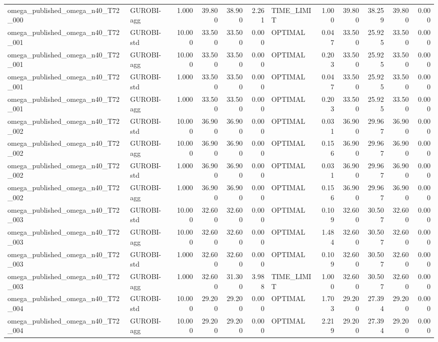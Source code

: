 \begin{table}[htbp]
\begin{tabular}{llrrrrlrrrrr}
omega\_published\_omega\_n40\_T72\_000 & GUROBI-agg & 1.000 & 39.800 & 38.900 & 2.261 & TIME\_LIMIT & 1.000 & 39.800 & 38.259 & 39.800 & 0.000 \\
omega\_published\_omega\_n40\_T72\_001 & GUROBI-std & 10.000 & 33.500 & 33.500 & 0.000 & OPTIMAL & 0.047 & 33.500 & 25.925 & 33.500 & 0.000 \\
omega\_published\_omega\_n40\_T72\_001 & GUROBI-agg & 10.000 & 33.500 & 33.500 & 0.000 & OPTIMAL & 0.203 & 33.500 & 25.925 & 33.500 & 0.000 \\
omega\_published\_omega\_n40\_T72\_001 & GUROBI-std & 1.000 & 33.500 & 33.500 & 0.000 & OPTIMAL & 0.047 & 33.500 & 25.925 & 33.500 & 0.000 \\
omega\_published\_omega\_n40\_T72\_001 & GUROBI-agg & 1.000 & 33.500 & 33.500 & 0.000 & OPTIMAL & 0.203 & 33.500 & 25.925 & 33.500 & 0.000 \\
omega\_published\_omega\_n40\_T72\_002 & GUROBI-std & 10.000 & 36.900 & 36.900 & 0.000 & OPTIMAL & 0.031 & 36.900 & 29.967 & 36.900 & 0.000 \\
omega\_published\_omega\_n40\_T72\_002 & GUROBI-agg & 10.000 & 36.900 & 36.900 & 0.000 & OPTIMAL & 0.156 & 36.900 & 29.967 & 36.900 & 0.000 \\
omega\_published\_omega\_n40\_T72\_002 & GUROBI-std & 1.000 & 36.900 & 36.900 & 0.000 & OPTIMAL & 0.031 & 36.900 & 29.967 & 36.900 & 0.000 \\
omega\_published\_omega\_n40\_T72\_002 & GUROBI-agg & 1.000 & 36.900 & 36.900 & 0.000 & OPTIMAL & 0.156 & 36.900 & 29.967 & 36.900 & 0.000 \\
omega\_published\_omega\_n40\_T72\_003 & GUROBI-std & 10.000 & 32.600 & 32.600 & 0.000 & OPTIMAL & 0.109 & 32.600 & 30.507 & 32.600 & 0.000 \\
omega\_published\_omega\_n40\_T72\_003 & GUROBI-agg & 10.000 & 32.600 & 32.600 & 0.000 & OPTIMAL & 1.484 & 32.600 & 30.507 & 32.600 & 0.000 \\
omega\_published\_omega\_n40\_T72\_003 & GUROBI-std & 1.000 & 32.600 & 32.600 & 0.000 & OPTIMAL & 0.109 & 32.600 & 30.507 & 32.600 & 0.000 \\
omega\_published\_omega\_n40\_T72\_003 & GUROBI-agg & 1.000 & 32.600 & 31.300 & 3.988 & TIME\_LIMIT & 1.000 & 32.600 & 30.507 & 32.600 & 0.000 \\
omega\_published\_omega\_n40\_T72\_004 & GUROBI-std & 10.000 & 29.200 & 29.200 & 0.000 & OPTIMAL & 1.703 & 29.200 & 27.394 & 29.200 & 0.000 \\
omega\_published\_omega\_n40\_T72\_004 & GUROBI-agg & 10.000 & 29.200 & 29.200 & 0.000 & OPTIMAL & 2.219 & 29.200 & 27.394 & 29.200 & 0.000 \\

\end{tabular}
\end{table}
